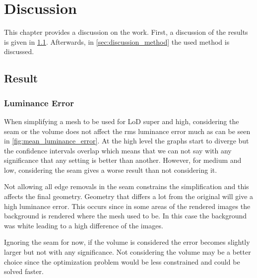 
\chapter{Discussion} \label{cha:discussion}
This chapter provides a discussion on the work. First, a discussion of the results is given in \cref{sec:discussion_result}. Afterwards, in \cref{sec:discussion_method} the used method is discussed.

\section{Result} \label{sec:discussion_result}

\subsection{Luminance Error} \label{sec:discussion_luminance}
When simplifying a mesh to be used for LoD super and high, considering the seam or the volume does not affect the rms luminance error much as can be seen in \cref{fig:mean_luminance_error}. At the high level the graphs start to diverge but the confidence intervals overlap which means that we can not say with any significance that any setting is better than another. However, for medium and low, considering the seam gives a worse result than not considering it.

Not allowing all edge removals in the seam constrains the simplification and this affects the final geometry. Geometry that differs a lot from the original will give a high luminance error. This occurs since in some areas of the rendered images the background is rendered where the mesh used to be. In this case the background was white leading to a high difference of the images.

Ignoring the seam for now, if the volume is considered the error becomes slightly larger but not with any significance. Not considering the volume may be a better choice since the optimization problem would be less constrained and could be solved faster.

